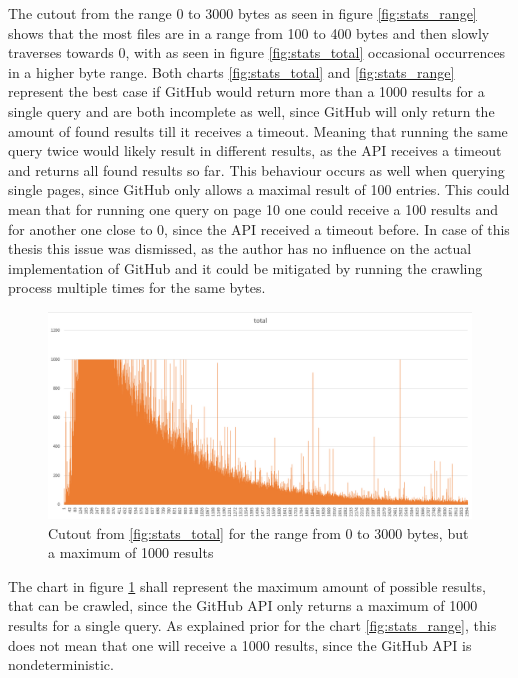 The cutout from the range 0 to 3000 bytes as seen in figure \ref{fig:stats_range} shows that the most files are in a range from 100 to 400 bytes and then slowly traverses towards 0, with as seen in figure \ref{fig:stats_total} occasional occurrences in a higher byte range. Both charts \ref{fig:stats_total} and \ref{fig:stats_range} represent the best case if GitHub would return more than a 1000 results for a single query and are both incomplete as well, since GitHub will only return the amount of found results till it receives a timeout. Meaning that running the same query twice would likely result in different results, as the API receives a timeout and returns all found results so far. This behaviour occurs as well when querying single pages, since GitHub only allows a maximal result of 100 entries. This could mean that for running one query on page 10 one could receive a 100 results and for another one close to 0, since the API received a timeout before. In case of this thesis this issue was dismissed, as the author has no influence on the actual implementation of GitHub and it could be mitigated by running the crawling process multiple times for the same bytes.

\begin{figure}[H]
    \centering
    \includegraphics[scale=0.5]{graphics/stats_range_max_possible.png}
    \caption{Cutout from \ref{fig:stats_total} for the range from 0 to 3000 bytes, but a maximum of 1000 results }
    \label{fig:stats_max_possible}
\end{figure}

The chart in figure \ref{fig:stats_max_possible} shall represent the maximum amount of possible results, that can be crawled, since the GitHub API only returns a maximum of 1000 results for a single query. As explained prior for the chart \ref{fig:stats_range}, this does not mean that one will receive a 1000 results, since the GitHub API is nondeterministic.

